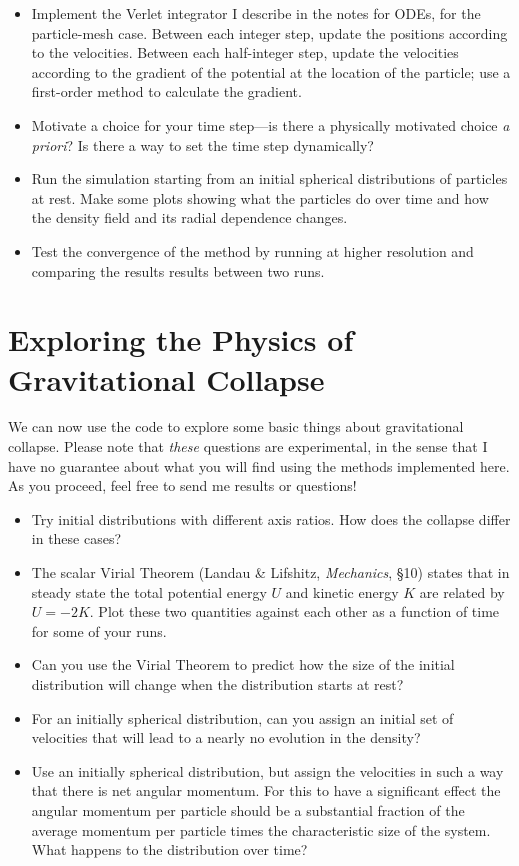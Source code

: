\documentclass[11pt, preprint]{aastex}
\begin{document}
\begin{itemize}
\item Implement the Verlet integrator I describe in the notes for
  ODEs, for the particle-mesh case. Between each integer step,
  update the positions according to the velocities. Between each
  half-integer step, update the velocities according to the gradient
  of the potential at the location of the particle; use a first-order
  method to calculate the gradient. 
\item Motivate a choice for your time step---is there a physically
  motivated choice {\it a priori}? Is there a way to set the time step
  dynamically? 
\item Run the simulation starting from an initial spherical
  distributions of particles at rest. Make some plots showing what the
  particles do over time and how the density field and its radial
  dependence changes. 
\item Test the convergence of the method by running at higher
  resolution and comparing the results results between two runs.
\end{itemize}

\section{Exploring the Physics of Gravitational Collapse}

We can now use the code to explore some basic things about
gravitational collapse. Please note that {\it these} questions are
experimental, in the sense that I have no guarantee about what you
will find using the methods implemented here. As you proceed, feel
free to send me results or questions!

\begin{itemize}  
\item Try initial distributions with different axis ratios. How does
  the collapse differ in these cases?
\item The scalar Virial Theorem (Landau \& Lifshitz, {\it Mechanics},
  \S10) states that in steady state the total potential energy $U$ and
  kinetic energy $K$ are related by $U = -2K$. Plot these two
  quantities against each other as a function of time for some of your
  runs.
\item Can you use the Virial Theorem to predict how the size of the
  initial distribution will change when the distribution starts at
  rest?
\item For an initially spherical distribution, can you assign an
  initial set of velocities that will lead to a nearly no evolution in
  the density? 
\item Use an initially spherical distribution, but assign the
  velocities in such a way that there is net angular momentum. For
  this to have a significant effect the angular momentum per particle
  should be a substantial fraction of the average momentum per
  particle times the characteristic size of the system. What happens
  to the distribution over time?
\end{itemize}
\end{document}
